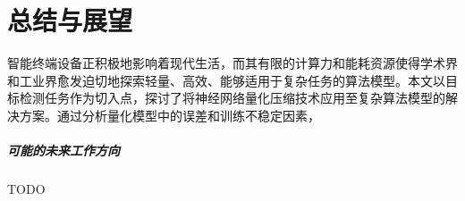 \chapter{总结与展望}
智能终端设备正积极地影响着现代生活，而其有限的计算力和能耗资源使得学术界和工业界愈发迫切地探索轻量、高效、能够适用于复杂任务的算法模型。本文以目标检测任务作为切入点，探讨了将神经网络量化压缩技术应用至复杂算法模型的解决方案。通过分析量化模型中的误差和训练不稳定因素，

\paragraph{可能的未来工作方向}
TODO
